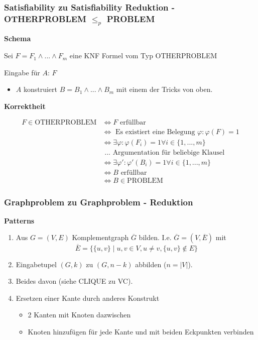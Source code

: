 \documentclass[a4paper, 11pt]{article}
\begin{document}
\subsubsection{Satisfiability zu Satisfiability Reduktion - OTHERPROBLEM $\leq_p$ PROBLEM}
	\textbf{Schema}
	
	Sei $F = F_1 \land ... \land F_m$ eine KNF Formel vom Typ OTHERPROBLEM
	
	
	Eingabe für $A$: $F$
	\begin{itemize}[label=-]
		\item $A$ konstruiert $B = B_1 \land ... \land B_m$ mit einem der Tricks von oben.
	\end{itemize} 

	
	\textbf{Korrektheit}
	
	
	\begin{align*}
		F \in \text{OTHERPROBLEM} &\iff F \text{ erfüllbar}\\
		&\iff \text{ Es existiert eine Belegung } \varphi: \varphi(F) = 1\\
		&\iff \exists \varphi: \varphi(F_i) = 1 \forall i \in \{1, ..., m\}\\
		&\text{  ...} \text{ Argumentation für beliebige Klausel }\\
		&\iff \exists \varphi': \varphi'(B_i) = 1 \forall i \in \{1, ..., m\}\\
		&\iff B \text{ erfüllbar}\\
		&\iff B \in \text{PROBLEM}
	\end{align*}


\subsubsection{Graphproblem zu Graphproblem - Reduktion}

	\textbf{Patterns}
	\begin{enumerate}[label=\arabic*.]
		
		\item Aus $G = (V, E)$ Komplementgraph $\overline{G}$ bilden. I.e. $\overline{G} = (V, \overline{E})$ mit 
		$$\overline{E} = \{\{u, v\} \mid u, v \in V, u \neq v, \{u, v\} \notin E\}$$
		
		\item Eingabetupel $(G, k)$ zu $(G, n - k)$ abbilden ($n = |V|$).
		
		\item Beides davon (siehe CLIQUE zu VC).
		
		\item Ersetzen einer Kante durch anderes Konstrukt 
		\begin{itemize}[label=-]
			\item 2 Kanten mit Knoten dazwischen
			\item Knoten hinzufügen für jede Kante und mit beiden Eckpunkten verbinden
		\end{itemize}
	\end{enumerate}
\end{document}
